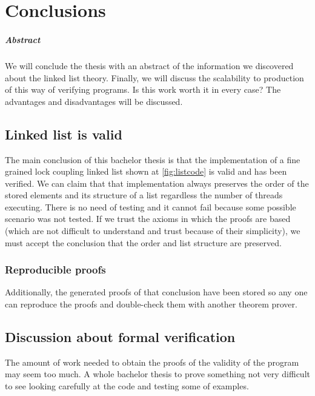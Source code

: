 \chapter{Conclusions\label{sec:conclusiones}}

\paragraph{Abstract} We will conclude the thesis with an abstract of the information we discovered about the linked list theory.
%
Finally, we will discuss the scalability to production of this way of verifying programs.
%
Is this work worth it in every case? 
%
The advantages and disadvantages will be discussed.

\section{Linked list is valid}

The main conclusion of this bachelor thesis is that the implementation of a fine grained lock coupling linked list shown at \ref{fig:listcode} is valid and has been verified. 
%
We can claim that that implementation always preserves the order of the stored elements and its structure of a list regardless the number of threads executing. 
%
There is no need of testing and it cannot fail because some possible scenario was not tested. 
% 
If we trust the axioms in which the proofs are based (which are not difficult to understand and trust because of their simplicity), we must accept the conclusion that the order and list structure are preserved.

\subsection{Reproducible proofs}

Additionally, the generated proofs of that conclusion have been stored so any one can reproduce the proofs and double-check them with another theorem prover.


\section{Discussion about formal verification}

The amount of work needed to obtain the proofs of the validity of the program may seem too much.
%
A whole bachelor thesis to prove something not very difficult to see looking carefully at the code and testing some of examples.

